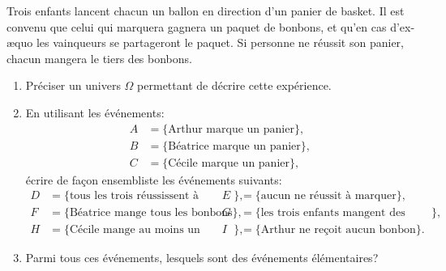 \documentclass[a4paper,11pt,reqno]{amsart}
\begin{document}


\begin{exo}

  Trois enfants lancent chacun un ballon en direction d'un panier de basket. Il est convenu que celui qui marquera gagnera un paquet de bonbons, et qu'en cas d'ex-æquo les vainqueurs se partageront le paquet. Si personne ne réussit son panier, chacun mangera le tiers des bonbons.
  \begin{enumerate}
    \item Préciser un univers $\Omega$ permettant de décrire cette expérience.
    \item En utilisant les événements:
      \vspace{-2ex}
      \begin{align*}
        A & = \{\text{Arthur marque un panier}\},\\
        B & = \{\text{Béatrice marque un panier}\},\\
        C & = \{\text{Cécile marque un panier}\},
      \end{align*}
      écrire de façon ensembliste les événements suivants:
      \begin{align*}
        D & = \{\text{tous les trois réussissent à marquer}\},&
        E & = \{\text{aucun ne réussit à marquer}\},\\
        F & = \{\text{Béatrice mange tous les bonbons}\},&
        G & = \{\text{les trois enfants mangent des bonbons}\},\\
        H & = \{\text{Cécile mange au moins un bonbon}\},&
        I & = \{\text{Arthur ne reçoit aucun bonbon}\}.
      \end{align*}
    \item Parmi tous ces événements, lesquels sont des événements élémentaires?
  \end{enumerate}

\end{exo}
\end{document}
